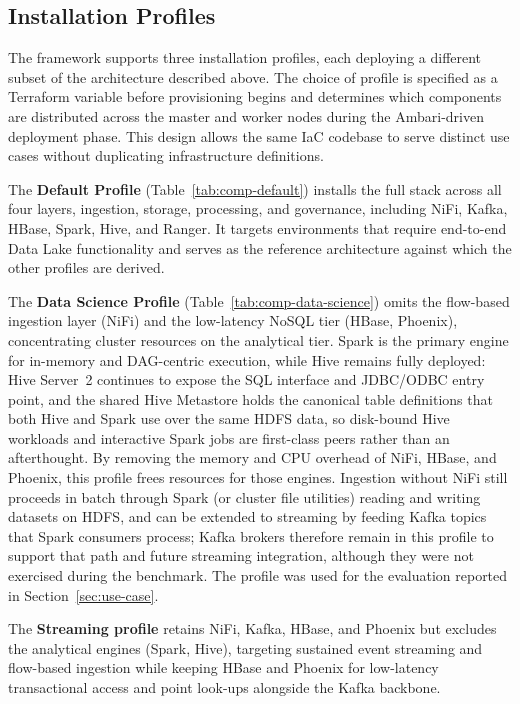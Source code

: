 \subsection{Installation Profiles}

The framework supports three installation profiles, each deploying a different
subset of the architecture described above. The choice of profile is specified
as a Terraform variable before provisioning begins and determines which
components are distributed across the master and worker nodes during the
Ambari-driven deployment phase. This design allows the same IaC codebase to
serve distinct use cases without duplicating infrastructure definitions.

The \textbf{Default Profile} (Table~\ref{tab:comp-default}) installs the full
stack across all four layers, ingestion, storage, processing, and
governance, including NiFi, Kafka, HBase, Spark, Hive, and Ranger. It targets
environments that require end-to-end Data Lake functionality and serves as the
reference architecture against which the other profiles are derived.

The \textbf{Data Science Profile} (Table~\ref{tab:comp-data-science}) omits the
flow-based ingestion layer (NiFi) and the low-latency NoSQL tier (HBase,
Phoenix), concentrating cluster resources on the analytical tier. Spark is the
primary engine for in-memory and DAG-centric execution, while Hive remains
fully deployed: Hive Server~2 continues to expose the SQL interface and JDBC/ODBC
entry point, and the shared Hive Metastore holds the canonical table definitions
that both Hive and Spark use over the same HDFS data, so disk-bound Hive
workloads and interactive Spark jobs are first-class peers rather than an
afterthought. By removing the memory and CPU overhead of NiFi, HBase, and
Phoenix, this profile frees resources for those engines. Ingestion without NiFi
still proceeds in batch through Spark (or cluster file utilities) reading and
writing datasets on HDFS, and can be extended to streaming by feeding Kafka topics
that Spark consumers process; Kafka brokers therefore remain in this profile to
support that path and future streaming integration, although they were not
exercised during the benchmark. The profile was used for the evaluation reported
in Section~\ref{sec:use-case}.

The \textbf{Streaming profile} retains NiFi, Kafka, HBase, and Phoenix but
excludes the analytical engines (Spark, Hive), targeting sustained event
streaming and flow-based ingestion while keeping HBase and Phoenix for
low-latency transactional access and point look-ups alongside the Kafka backbone.

